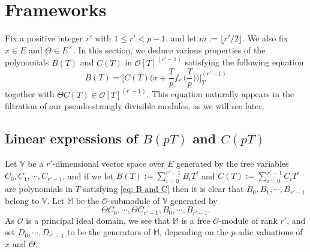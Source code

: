 \documentclass[11pt]{amsart}
\theoremstyle{definition}
\numberwithin{equation}{subsection}
\theoremstyle{plain}
\theoremstyle{plain}
\theoremstyle{plain}
\theoremstyle{plain}
\theoremstyle{plain}
\theoremstyle{plain}
\theoremstyle{plain}
\theoremstyle{plain}
\theoremstyle{plain}
\theoremstyle{plain}
\theoremstyle{plain}
\theoremstyle{plain}
\theoremstyle{definition}
\theoremstyle{definition}
\theoremstyle{definition}
\theoremstyle{remark}
\renewcommand{\(}{\textup{(}}
\renewcommand{\)}{\textup{)}}
\newcommand{\cO}{\mathcal{O}}
\begin{document}
\section{Frameworks}\label{sec: Frame works}
Fix a positive integer $r'$ with $1\leq r'<p-1$, and let $m:=\lfloor r'/2 \rfloor$. We also fix $x\in E$ and $\Theta\in E^\times$. In this section, we deduce various properties of the polynomials $B(T)$ and $C(T)$ in $\cO[T]^{(r'-1)}$ satisfying the following equation
\begin{equation}\label{eq: B and C}
B(T)=\bigg[C(T)\bigg(x+\frac{T}{p}f_{r'}\Big(\frac{T}{p}\Big) \bigg)\bigg]_{T}^{(r'-1)}
\end{equation}
together with $\Theta C(T)\in \cO[T]^{(r'-1)}$. This equation naturally appears in the filtration of our pseudo-strongly divisible modules, as we will see later.


\subsection{Linear expressions of $B(pT)$ and $C(pT)$}\label{subsec: linear expressions of B and C}
Let $\mathbb{V}$ be a $r'$-dimensional vector space over $E$ generated by the free variables $C_0, C_1,\cdots,C_{r'-1}$, and if we let $B(T):=\sum_{i=0}^{r'-1}B_iT^i$ and $C(T):=\sum_{i=0}^{r'-1}C_iT^i$ are polynomials in $T$ satisfying \eqref{eq: B and C} then it is clear that $B_0,B_1,\cdots,B_{r'-1}$ belong to $\mathbb{V}$. Let $\mathbb{M}$ be the $\cO$-submodule of $\mathbb{V}$ generated by $$\Theta C_0,\cdots,\Theta C_{r'-1}, B_0,\cdots,B_{r'-1}.$$ As $\cO$ is a principal ideal domain, we see that $\mathbb{M}$ is a free $\cO$-module of rank $r'$, and set $D_0,\cdots,D_{r'-1}$ to be the generators of $\mathbb{M}$, depending on the $p$-adic valuations of $x$ and $\Theta$.
\end{document}
